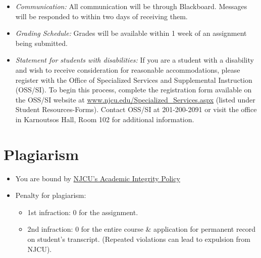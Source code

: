 \documentclass[11pt,article,oneside]{memoir}
\begin{document}
\begin{itemize}
\item \textit{Communication:} All communication will be through Blackboard. Messages will be responded to within two days of receiving them. 

\item \textit{Grading Schedule:} Grades will be available within 1 week of an assignment being submitted.

\item \textit{Statement for students with disabilities:} If you are a student
with a disability and wish to receive consideration for reasonable
accommodations, please register with the Office of Specialized Services
and Supplemental Instruction (OSS/SI). To begin this process, complete
the registration form available on the OSS/SI website at
\href{http://www.njcu.edu/Specialized_Services.aspx}{www.njcu.edu/Specialized\_Services.aspx}
(listed under Student Resources-Forms). Contact OSS/SI at 201-200-2091
or visit the office in Karnoutsos Hall, Room 102 for additional
information.
\end{itemize}

\section{Plagiarism}

\begin{itemize} 
\item You are bound by \href{http://www.njcu.edu/uploadedFiles/About_NJCU/Governance_and_Organization/University_Senate/Policies/Academic\%20INTEGRITY\%20POLICY\%20FINAL\%202-04.pdf}{NJCU's Academic Integrity Policy}
\item Penalty for plagiarism:
\begin{itemize}
\item 1st infraction: 0 for the assignment. 
\item 2nd infraction: 0 for the entire course \& application for permanent record on student's transcript. (Repeated violations can lead to expulsion from NJCU). 
\end{itemize}
\end{itemize}
\end{document}
